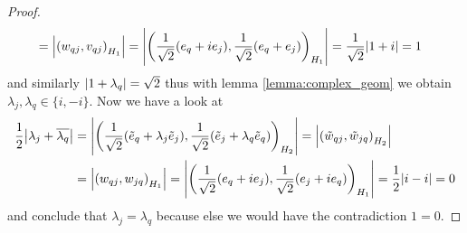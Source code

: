\begin{proof}
\begin{align*}
		&= {\left | {\left ( w_{qj}, v_{qj} \right )}_{H_1} \right |} = {\left | {\left ( \frac{1}{\sqrt{2}}(e_q + ie_j), \frac{1}{\sqrt{2}} (e_q + e_j) \right )}_{H_1} \right |} = \frac{1}{\sqrt{2}} {\left | 1 + i \right |} = 1
	\end{align*}
	and similarly ${\left | 1 + \lambda_q \right |} = \sqrt{2}$ thus with lemma \ref{lemma:complex_geom} we obtain $\lambda_j, \lambda_q \in \{i, -i\}$. Now we have a look at
	\begin{align*}
		\frac{1}{2}{\left | \lambda_j + \overline{\lambda_q} \right |} &= {\left | {\left ( \frac{1}{\sqrt{2}}(\tilde{e}_q + \lambda_j \tilde{e}_j), \frac{1}{\sqrt{2}}(\tilde{e}_j + \lambda_{q} \tilde{e}_q) \right )}_{H_2} \right |} = {\left | {\left ( \tilde{w}_{qj}, \tilde{w}_{jq} \right )}_{H_2} \right |} \\
		&= {\left | {\left ( w_{qj}, w_{jq} \right )}_{H_1} \right |} = {\left | {\left ( \frac{1}{\sqrt{2}}(e_q + i e_j), \frac{1}{\sqrt{2}}(e_j + i e_q) \right )}_{H_1} \right |} = \frac{1}{2}{\left | i - i \right |} = 0
	\end{align*}
	and conclude that $\lambda_j = \lambda_q$ because else we would have the contradiction $1 = 0$. 
\end{proof}


